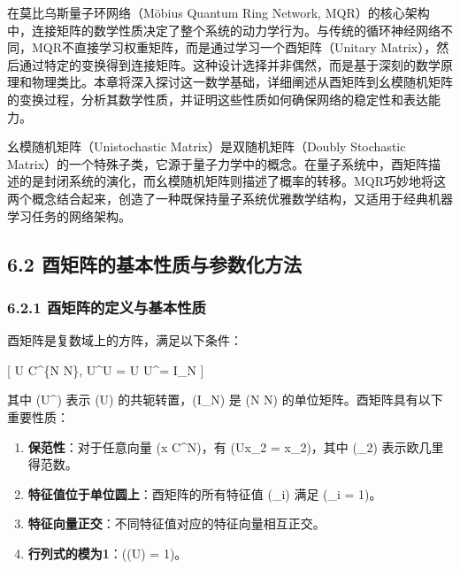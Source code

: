 \documentclass[
  12pt,
]{article}
\providecommand{\tightlist}{%
  \setlength{\itemsep}{0pt}\setlength{\parskip}{0pt}}
\begin{document}
在莫比乌斯量子环网络（Möbius Quantum Ring Network,
MQR）的核心架构中，连接矩阵的数学性质决定了整个系统的动力学行为。与传统的循环神经网络不同，MQR不直接学习权重矩阵，而是通过学习一个酉矩阵（Unitary
Matrix），然后通过特定的变换得到连接矩阵。这种设计选择并非偶然，而是基于深刻的数学原理和物理类比。本章将深入探讨这一数学基础，详细阐述从酉矩阵到幺模随机矩阵的变换过程，分析其数学性质，并证明这些性质如何确保网络的稳定性和表达能力。

幺模随机矩阵（Unistochastic Matrix）是双随机矩阵（Doubly Stochastic
Matrix）的一个特殊子类，它源于量子力学中的概念。在量子系统中，酉矩阵描述的是封闭系统的演化，而幺模随机矩阵则描述了概率的转移。MQR巧妙地将这两个概念结合起来，创造了一种既保持量子系统优雅数学结构，又适用于经典机器学习任务的网络架构。

\hypertarget{ux9149ux77e9ux9635ux7684ux57faux672cux6027ux8d28ux4e0eux53c2ux6570ux5316ux65b9ux6cd5}{%
\subsection{6.2
酉矩阵的基本性质与参数化方法}\label{ux9149ux77e9ux9635ux7684ux57faux672cux6027ux8d28ux4e0eux53c2ux6570ux5316ux65b9ux6cd5}}

\hypertarget{ux9149ux77e9ux9635ux7684ux5b9aux4e49ux4e0eux57faux672cux6027ux8d28-1}{%
\subsubsection{6.2.1
酉矩阵的定义与基本性质}\label{ux9149ux77e9ux9635ux7684ux5b9aux4e49ux4e0eux57faux672cux6027ux8d28-1}}

酉矩阵是复数域上的方阵，满足以下条件：

{[} U \in C\^{}\{N \times N\}, \quad U\^{}\dagger U = U
U\^{}\dagger = I\_N {]}

其中 (U\^{}\dagger) 表示 (U) 的共轭转置，(I\_N) 是 (N \times N)
的单位矩阵。酉矩阵具有以下重要性质：

\begin{enumerate}
\def\labelenumi{\arabic{enumi}.}
\tightlist
\item
  \textbf{保范性}：对于任意向量 (x \in C\^{}N)，有
  (\textbar Ux\textbar\_2 = \textbar x\textbar\_2)，其中
  (\textbar{}\cdot\textbar\_2) 表示欧几里得范数。
\item
  \textbf{特征值位于单位圆上}：酉矩阵的所有特征值 (\lambda\_i) 满足
  (\textbar{}\lambda\_i\textbar{} = 1)。
\item
  \textbf{特征向量正交}：不同特征值对应的特征向量相互正交。
\item
  \textbf{行列式的模为1}：(\textbar{}\det(U)\textbar{} = 1)。
\end{enumerate}
\end{document}
